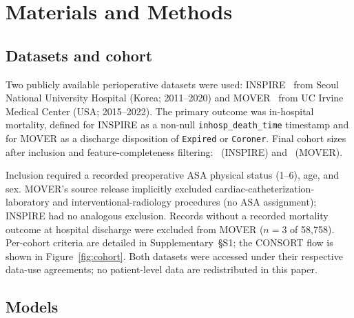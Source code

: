 

\section{Materials and Methods}
\label{sec:methods}

\subsection{Datasets and cohort}
\label{methods:datasets}

Two publicly available perioperative datasets were used: INSPIRE~\cite{Lim2024} from Seoul National University Hospital (Korea; 2011--2020) and MOVER~\cite{Samad2023} from UC Irvine Medical Center (USA; 2015--2022). The primary outcome was in-hospital mortality, defined for INSPIRE as a non-null \texttt{inhosp\_death\_time} timestamp and for MOVER as a discharge disposition of \texttt{Expired} or \texttt{Coroner}. Final cohort sizes after inclusion and feature-completeness filtering: \pnTableOneNInspire\ (INSPIRE) and \pnTableOneNMover\ (MOVER).

Inclusion required a recorded preoperative ASA physical status (1--6), age, and sex. MOVER's source release implicitly excluded cardiac-catheterization-laboratory and interventional-radiology procedures (no ASA assignment); INSPIRE had no analogous exclusion. Records without a recorded mortality outcome at hospital discharge were excluded from MOVER ($n = 3$ of 58{,}758). Per-cohort criteria are detailed in Supplementary~§S1; the CONSORT flow is shown in Figure~\ref{fig:cohort}. Both datasets were accessed under their respective data-use agreements; no patient-level data are redistributed in this paper.

\subsection{Models}
\label{methods:models}

